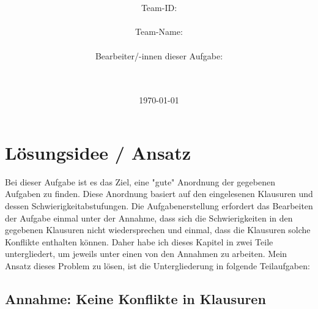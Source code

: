 \documentclass[a4paper,10pt,ngerman]{scrartcl}
\title{\textbf{\Huge\Aufgabe}}
\author{\LARGE Team-ID: \LARGE \TeamId \\\\
	    \LARGE Team-Name: \LARGE \TeamName \\\\
	    \LARGE Bearbeiter/-innen dieser Aufgabe: \\ 
	    \LARGE \Namen\\\\}
\date{\LARGE\today}
\begin{document}
\maketitle
\tableofcontents

\vspace{0.5cm}

\section{Lösungsidee / Ansatz}

Bei dieser Aufgabe ist es das Ziel, eine "gute" Anordnung der gegebenen Aufgaben zu finden. Diese Anordnung basiert auf den eingelesenen
Klausuren und dessen Schwierigkeitabstufungen. Die Aufgabenerstellung erfordert das Bearbeiten der Aufgabe einmal unter der Annahme, dass
sich die Schwierigkeiten in den gegebenen Klausuren nicht wiedersprechen und einmal, dass die Klausuren solche Konflikte enthalten können. Daher habe ich dieses Kapitel in 
zwei Teile untergliedert, um jeweils unter einen von den Annahmen zu arbeiten.
Mein Ansatz dieses Problem zu lösen, ist die Untergliederung in folgende Teilaufgaben:

\subsection{Annahme: Keine Konflikte in Klausuren}
\end{document}
